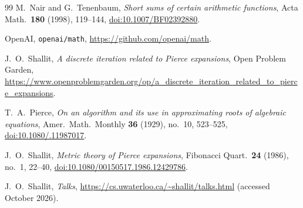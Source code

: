 \documentclass[11pt]{article}
\theoremstyle{definition}
\theoremstyle{remark}
\begin{document}
\begin{thebibliography}{99}
M.~Nair and G.~Tenenbaum,
\emph{Short sums of certain arithmetic functions},
Acta Math.\ \textbf{180} (1998), 119--144,
\href{https://doi.org/10.1007/BF02392880}{doi:10.1007/BF02392880}.

OpenAI,
\texttt{openai/math}, \url{https://github.com/openai/math}.

J.~O.~Shallit,
\emph{A discrete iteration related to Pierce expansions},
Open Problem Garden,
\url{https://www.openproblemgarden.org/op/a_discrete_iteration_related_to_pierce_expansions}.

T.~A.~Pierce,
\emph{On an algorithm and its use in approximating roots of algebraic equations},
Amer.\ Math.\ Monthly \textbf{36} (1929), no.~10, 523--525,
\href{https://doi.org/10.1080/00029890.1929.11987017}{doi:10.1080/.11987017}.

J.~O.~Shallit,
\emph{Metric theory of Pierce expansions},
Fibonacci Quart.\ \textbf{24} (1986), no.~1, 22--40,
\href{https://doi.org/10.1080/00150517.1986.12429786}{doi:10.1080/00150517.1986.12429786}.

J.~O.~Shallit,
\emph{Talks}, \url{https://cs.uwaterloo.ca/~shallit/talks.html}
(accessed October 2026).

\end{thebibliography}
\end{document}
